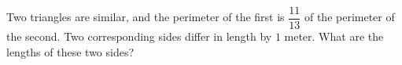 Two triangles are similar, and the perimeter of the first is $\dfrac{11}{13}$ of the perimeter of the second. Two corresponding sides differ in length by $1$ meter. What are the lengths of these two sides?

